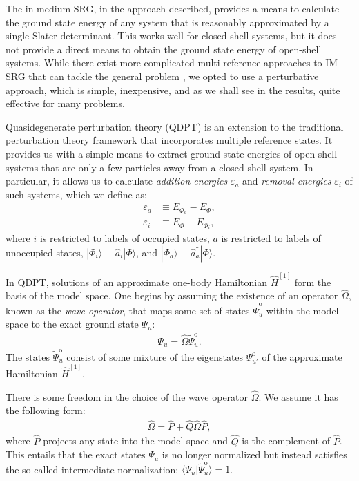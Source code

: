 The in-medium SRG, in the approach described, provides a means to calculate the ground state energy of any system that is reasonably approximated by a single Slater determinant.  This works well for closed-shell systems, but it does not provide a direct means to obtain the ground state energy of open-shell systems.  While there exist more complicated multi-reference approaches to IM-SRG that can tackle the general problem \cite{Hergert2016165}, we opted to use a perturbative approach, which is simple, inexpensive, and as we shall see in the results, quite effective for many problems.

Quasidegenerate perturbation theory (QDPT) is an extension to the traditional perturbation theory framework that incorporates multiple reference states.  It provides us with a simple means to extract ground state energies of open-shell systems that are only a few particles away from a closed-shell system.  In particular, it allows us to calculate \textit{addition energies} $\varepsilon_a$ and \textit{removal energies} $\varepsilon_i$ of such systems, which we define as:
\begin{align}
  \varepsilon_a &\equiv E_{\Phi_a} - E_{\Phi}, \\
  \varepsilon_i &\equiv E_{\Phi} - E_{\Phi_i},
\end{align}
where $i$ is restricted to labels of occupied states, $a$ is restricted to labels of unoccupied states, $|\Phi_i\rangle \equiv \hat{a}_i^{} |\Phi\rangle$, and $|\Phi_a\rangle \equiv \hat{a}_a^\dagger |\Phi\rangle$.

In QDPT, solutions of an approximate one-body Hamiltonian $\hat{H}^{[1]}$ form the basis of the model space.  One begins by assuming the existence of an operator $\hat{\Omega}$, known as the \textit{wave operator}, that maps some set of states $\tilde \Psi^{\mathrm{o}}_u$ within the model space to the exact ground state $\Psi_u$:
\begin{align} \label{eq:omega-condition1}
  \Psi_u = \hat \Omega \tilde \Psi^{\mathrm{o}}_u.
\end{align}
The states $\tilde \Psi^{\mathrm{o}}_u$ consist of some mixture of the eigenstates $\Psi^{\mathrm{o}}_{u'}$ of the approximate Hamiltonian $\hat{H}^{[1]}$.

There is some freedom in the choice of the wave operator $\hat \Omega$.  We assume it has the following form:
\begin{align} \label{eq:omega-condition2}
  \hat \Omega = \hat P + \hat Q \hat \Omega \hat P,
\end{align}
where $\hat P$ projects any state into the model space and $\hat Q$ is the complement of $\hat P$.  This entails that the exact states $\Psi_u$ is no longer normalized but instead satisfies the so-called intermediate normalization: $\langle \Psi_u | \tilde \Psi^{\mathrm{o}}_u \rangle = 1$.

